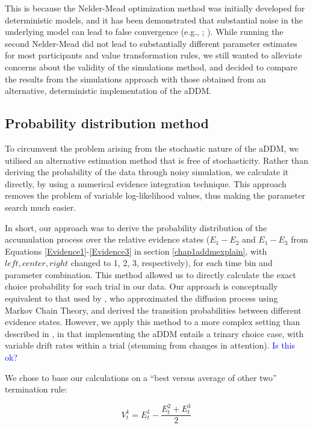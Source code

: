 \documentclass[11pt,a4paper]{article}
\newcommand{\AT}[1] {{\textcolor{blue}{#1}}}
\begin{document}
This is because the Nelder-Mead optimization method was initially developed for deterministic models, and it has been demonstrated that substantial noise in the underlying model can lead to false convergence (e.g., ; ). While running the second Nelder-Mead did not lead to substantially different parameter estimates for most participants and value transformation rules, we still wanted to alleviate concerns about the validity of the simulations method, and decided to compare the results from the simulations approach with those obtained from an alternative, deterministic implementation of the aDDM.


\subsection{Probability distribution method}

To circumvent the problem arising from the stochastic nature of the aDDM, we utilised an alternative estimation method that is free of stochasticity. Rather than deriving the probability of the data through noisy simulation, we calculate it directly, by using a numerical evidence integration technique. This approach removes the problem of variable log-likelihood values, thus making the parameter search much easier.


 In short, our approach was to derive the probability distribution of the accumulation process over the relative evidence states ($E_{1}-E_{2}$ and $E_{1}-E_{3}$ from Equations \ref{Evidence1}-\ref{Evidence3} in section \ref{chap1addmexplain}, with $left, center, right$ changed to 1, 2, 3, respectively), for each time bin and parameter combination. This method allowed us to directly calculate the exact choice probability for each trial in our data. Our approach is conceptually equivalent to that used by , who approximated the diffusion process using Markov Chain Theory, and derived the transition probabilities between different evidence states. However, we apply this method to a more complex setting than described in , in that implementing the aDDM entails a trinary choice case, with variable drift rates within a trial (stemming from changes in attention). \AT{Is this ok?}

We chose to base our calculations on a ``best versus average of other two''  termination rule:

\begin{equation} \label{REA1pd}
V_{t}^{1}=E_{t}^{1}-\frac{E_{t}^{2}+E_{t}^{3}}{2}
\end{equation}
\end{document}
